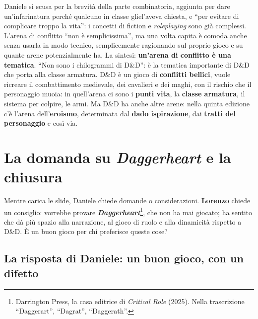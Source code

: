 Daniele si scusa per la brevità della parte combinatoria, aggiunta per dare un'infarinatura perché
qualcuno in classe gliel'aveva chiesta, e ``per evitare di complicare troppo la vita'': i concetti di
fiction e \emph{roleplaying} sono già complessi. L'arena di conflitto ``non è semplicissima'', ma una
volta capita è comoda anche senza usarla in modo tecnico, semplicemente ragionando sul proprio gioco
e su quante arene potenzialmente ha. La sintesi: \textbf{un'arena di conflitto è una tematica}.
``Non sono i chilogrammi di D\&D'': è la tematica importante di D\&D che porta alla classe armatura.
D\&D è un gioco di \textbf{conflitti bellici}, vuole ricreare il combattimento medievale, dei
cavalieri e dei maghi, con il rischio che il personaggio muoia: in quell'arena ci sono i
\textbf{punti vita}, la \textbf{classe armatura}, il sistema per colpire, le armi. Ma D\&D ha anche
altre arene: nella quinta edizione c'è l'arena dell'\textbf{eroismo}, determinata dal \textbf{dado
ispirazione}, dai \textbf{tratti del personaggio} e così via.

\section{La domanda su \emph{Daggerheart} e la chiusura}
\label{a16:sec:daggerheart}

Mentre carica le slide, Daniele chiede domande o considerazioni. \textbf{Lorenzo} chiede un consiglio:
vorrebbe provare \textbf{\emph{Daggerheart}}\footnote{Darrington Press, la casa editrice di
\emph{Critical Role} (2025). Nella trascrizione ``Daggerart'', ``Dagrat'', ``Daggerath''.}, che non ha
mai giocato; ha sentito che dà più spazio alla narrazione, al gioco di ruolo e alla dinamicità
rispetto a D\&D. È un buon gioco per chi preferisce queste cose?

\subsection{La risposta di Daniele: un buon gioco, con un difetto}

